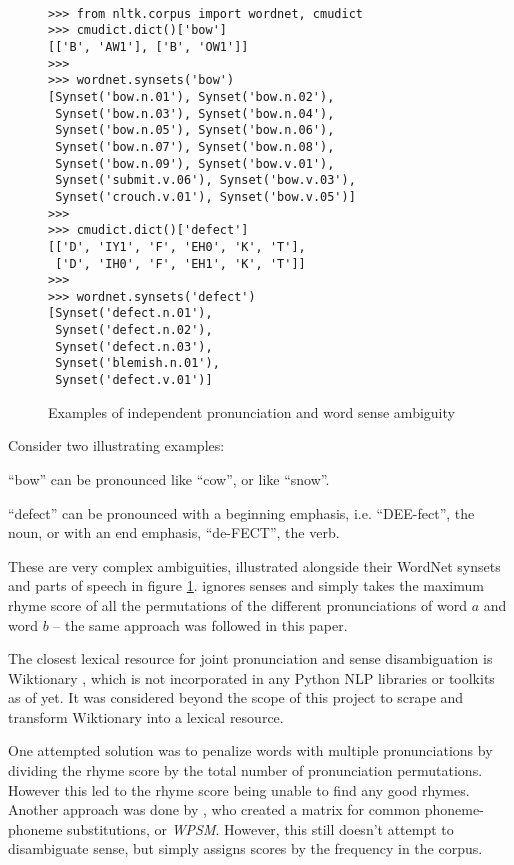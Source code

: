\documentclass[11pt,a4paper]{article}
\newenvironment{tight_enumerate}{
\begin{enumerate}
\setlength{\itemsep}{0pt}
\setlength{\parskip}{0pt}
}{\end{enumerate}}
\begin{document}
\begin{figure}
\begin{Verbatim}[fontsize=\small]

>>> from nltk.corpus import wordnet, cmudict
>>> cmudict.dict()['bow']
[['B', 'AW1'], ['B', 'OW1']]
>>>
>>> wordnet.synsets('bow')
[Synset('bow.n.01'), Synset('bow.n.02'),
 Synset('bow.n.03'), Synset('bow.n.04'),
 Synset('bow.n.05'), Synset('bow.n.06'),
 Synset('bow.n.07'), Synset('bow.n.08'),
 Synset('bow.n.09'), Synset('bow.v.01'),
 Synset('submit.v.06'), Synset('bow.v.03'),
 Synset('crouch.v.01'), Synset('bow.v.05')]
>>>
>>> cmudict.dict()['defect']
[['D', 'IY1', 'F', 'EH0', 'K', 'T'],
 ['D', 'IH0', 'F', 'EH1', 'K', 'T']]
>>>
>>> wordnet.synsets('defect')
[Synset('defect.n.01'),
 Synset('defect.n.02'),
 Synset('defect.n.03'),
 Synset('blemish.n.01'),
 Synset('defect.v.01')]
\end{Verbatim}
\caption{Examples of independent pronunciation and word sense ambiguity}
\label{fig:wordnet}
\end{figure}

Consider two illustrating examples:
\begin{tight_enumerate}
	\vspace{-0.5em}
	\item
		``bow'' can be pronounced like ``cow'', or like ``snow''.
	\item
		``defect'' can be pronounced with a beginning emphasis, i.e. ``DEE-fect'', the noun, or with an end emphasis, ``de-FECT'', the verb.
\end{tight_enumerate}

These are very complex ambiguities, illustrated alongside their WordNet synsets and parts of speech in figure \ref{fig:wordnet}. \citet{keswarani} ignores senses and simply takes the maximum rhyme score of all the permutations of the different pronunciations of word $a$ and word $b$ -- the same approach was followed in this paper.

The closest lexical resource for joint pronunciation and sense disambiguation is Wiktionary \cite{wiktionary}, which is not incorporated in any Python NLP libraries or toolkits as of yet. It was considered beyond the scope of this project to scrape and transform Wiktionary into a lexical resource.

One attempted solution was to penalize words with multiple pronunciations by dividing the rhyme score by the total number of pronunciation permutations. However this led to the rhyme score being unable to find any good rhymes. Another approach was done by \citet{hixon}, who created a matrix for common phoneme-phoneme substitutions, or \textit{WPSM}. However, this still doesn't attempt to disambiguate sense, but simply assigns scores by the frequency in the corpus.
\end{document}
